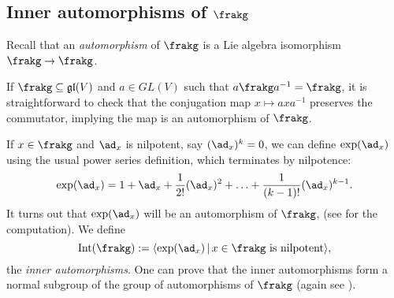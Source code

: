 \subsection{Inner automorphisms of $\frakg$}
Recall that an \emph{automorphism} of $\frakg$ is a Lie algebra isomorphism $\frakg \to \frakg$.

\begin{example}
If $\frakg \subseteq \mathfrak{gl}(V)$ and $a \in GL(V)$ such that $a \frakg a^{-1} = \frakg$, it is straightforward to check that the conjugation map $x \mapsto a x a^{-1}$ preserves the commutator, implying the map is an automorphism of $\frakg$.
\end{example}

If $x \in \frakg$ and $\ad_x$ is nilpotent, say $(\ad_x)^k = 0$, we can define $\exp(\ad_x)$ using the usual power series definition, which terminates by nilpotence:
$$\exp(\ad_x) = 1 + \ad_x + \frac{1}{2!} (\ad_x)^2 + \ldots + \frac{1}{(k-1)!} (\ad_x)^{k-1}.$$
It turns out that $\exp(\ad_x)$ will be an automorphism of $\frakg$, (see \cite[\S 2.3]{Humphreys72} for the computation).
We define 
$$\mathrm{Int}(\frakg) := \langle \exp(\ad_x) \, | \, x \in \frakg \text{ is nilpotent}\rangle,$$
the \emph{inner automorphisms}.
One can prove that the inner automorphisms form a normal subgroup of the group of automorphisms of $\frakg$ (again see \cite[\S 2.3]{Humphreys72}).

